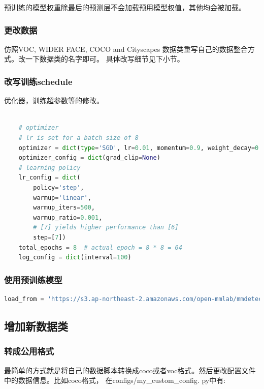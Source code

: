 \documentclass[UTF8]{ctexart}
\begin{document}
预训练的模型权重除最后的预测层不会加载预用模型权值，其他均会被加载。

\subsubsection{更改数据}
仿照VOC, WIDER FACE, COCO and Cityscapes 数据类重写自己的数据整合方式。改一下数据类的名字即可。
具体改写细节见下小节。

\subsubsection{改写训练schedule}

优化器，训练超参数等的修改。
\lstset{style=mystyle}
\begin{lstlisting}[language=Python]

	# optimizer
	# lr is set for a batch size of 8
	optimizer = dict(type='SGD', lr=0.01, momentum=0.9, weight_decay=0.0001)
	optimizer_config = dict(grad_clip=None)
	# learning policy
	lr_config = dict(
		policy='step',
		warmup='linear',
		warmup_iters=500,
		warmup_ratio=0.001,
		# [7] yields higher performance than [6]
		step=[7])
	total_epochs = 8  # actual epoch = 8 * 8 = 64
	log_config = dict(interval=100)

\end{lstlisting}


\subsubsection{使用预训练模型}

\lstset{style=mystyle}
\begin{lstlisting}[language=Python]
load_from = 'https://s3.ap-northeast-2.amazonaws.com/open-mmlab/mmdetection/models/mask_rcnn_r50_fpn_2x_20181010-41d35c05.pth' 

\end{lstlisting}


\subsection{增加新数据类}

\subsubsection{转成公用格式}
最简单的方式就是将自己的数据脚本转换成coco或者voc格式。然后更改配置文件中的数据信息。比如coco格式，
在configs/my\_custom\_config.
py中有:
\end{document}
